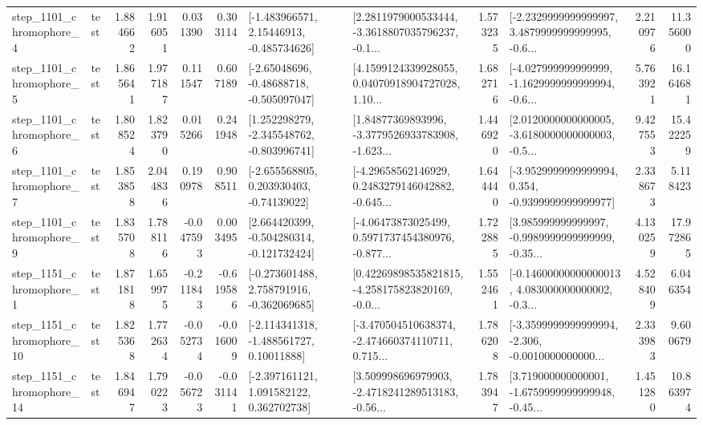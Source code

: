 \begin{tabular}{llrrrrllrlrr}
  step\_1101\_chromophore\_4 &      test &      1.884662 &    1.916051 &      0.031390 &  0.303114 &    [-1.483966571, 2.15446913, -0.485734626] &  [2.2811979000533444, -3.3618807035796237, -0.1... &       1.573235 &  [-2.2329999999999997, 3.4879999999999995, -0.6... &            2.210976 &         11.356000 \\
  step\_1101\_chromophore\_5 &      test &      1.865641 &    1.977187 &      0.111547 &  0.607189 &    [-2.65048696, -0.48688718, -0.505097047] &  [4.1599124339928055, 0.04070918904727028, 1.10... &       1.682716 &  [-4.027999999999999, -1.1629999999999994, -0.6... &            5.763921 &         16.164681 \\
  step\_1101\_chromophore\_6 &      test &      1.808524 &    1.823790 &      0.015266 &  0.241948 &   [1.252298279, -2.345548762, -0.803996741] &  [1.84877369893996, -3.3779526933783908, -1.623... &       1.446920 &  [2.0120000000000005, -3.6180000000000003, -0.5... &            9.427553 &         15.422259 \\
  step\_1101\_chromophore\_7 &      test &      1.853858 &    2.044836 &      0.190978 &  0.908511 &    [-2.655568805, 0.203930403, -0.74139022] &  [-4.29658562146929, 0.2483279146042882, -0.645... &       1.644440 &  [-3.9529999999999994, 0.354, -0.9399999999999977] &            2.338673 &          5.118423 \\
  step\_1101\_chromophore\_9 &      test &      1.835708 &    1.788116 &     -0.047593 &  0.003495 &   [2.664420399, -0.504280314, -0.121732424] &  [-4.06473873025499, 0.5971737454380976, -0.877... &       1.722885 &  [3.985999999999997, -0.9989999999999999, -0.35... &            4.130259 &         17.972865 \\
  step\_1151\_chromophore\_1 &      test &      1.871818 &    1.659975 &     -0.211843 & -0.619586 &   [-0.273601488, 2.758791916, -0.362069685] &  [0.42269898535821815, -4.258175823820169, -0.0... &       1.552461 &  [-0.14600000000000013, 4.083000000000002, -0.3... &            4.528409 &          6.046354 \\
 step\_1151\_chromophore\_10 &      test &      1.825368 &    1.772634 &     -0.052734 & -0.016009 &    [-2.114341318, -1.488561727, 0.10011888] &  [-3.470504510638374, -2.474660374110711, 0.715... &       1.786208 &  [-3.3599999999999994, -2.306, -0.0010000000000... &            2.333983 &          9.600679 \\
 step\_1151\_chromophore\_14 &      test &      1.846947 &    1.790223 &     -0.056723 & -0.031141 &    [-2.397161121, 1.091582122, 0.362702738] &  [3.509998696979903, -2.4718241289513183, -0.56... &       1.783947 &  [3.719000000000001, -1.6759999999999948, -0.45... &            1.451280 &         10.863974 \\

\end{tabular}
